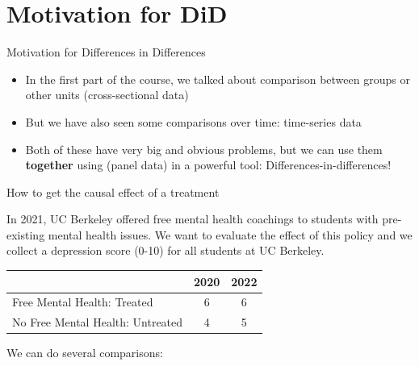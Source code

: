 \documentclass[11pt]{beamer}
\begin{document}
\section{Motivation for DiD}

\begin{frame}{Motivation for Differences in Differences}
\begin{itemize}
    \item In the first part of the course, we talked about comparison between groups or other units (cross-sectional data)
    \item But we have also seen some comparisons over time: time-series data
    \item Both of these have very big and obvious problems, but we can use them \textbf{together} using (panel data) in a powerful tool: Differences-in-differences!
\end{itemize}
   
\end{frame}



\begin{frame}{How to get the causal effect of a treatment}

In 2021, UC Berkeley offered free mental health coachings to students with pre-existing mental health issues. We want to evaluate the effect of this policy and we collect a depression score (0-10) for all students at UC Berkeley. 

\begin{table}[]
\begin{tabular}{lcc}
\toprule
\textbf{}                        & \textbf{2020} & \textbf{2022} \\ \midrule
Free Mental Health: Treated      & 6          & 6          \\ \midrule
No Free Mental Health: Untreated & 4          & 5          \\ \bottomrule
\end{tabular}
\end{table}

We can do several comparisons:
\end{frame}
\end{document}

